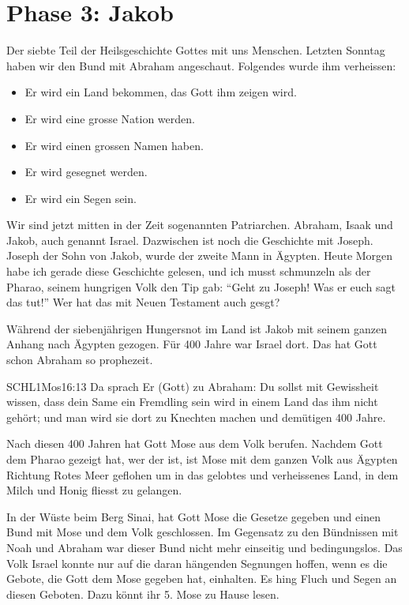 \section{Phase 3: Jakob}

    Der siebte Teil der Heilsgeschichte Gottes mit uns Menschen. Letzten Sonntag haben wir den Bund mit Abraham angeschaut. Folgendes wurde ihm verheissen:
    \begin{itemize}
        \item Er wird ein Land bekommen, das Gott ihm zeigen wird.
        \item Er wird eine grosse Nation werden.
        \item Er wird einen grossen Namen haben.
        \item Er wird gesegnet werden.
        \item Er wird ein Segen sein.
    \end{itemize}
    Wir sind jetzt mitten in der Zeit sogenannten Patriarchen. Abraham, Isaak und Jakob, auch genannt Israel. Dazwischen ist noch die Geschichte mit Joseph. Joseph der Sohn von Jakob, wurde der zweite Mann in Ägypten.  Heute Morgen habe ich gerade diese Geschichte gelesen, und ich musst schmunzeln als der Pharao, seinem hungrigen Volk den Tip gab: \enquote{Geht zu Joseph! Was er euch sagt das tut!} Wer hat das mit Neuen Testament auch gesgt?
    
    Während der siebenjährigen Hungersnot im Land ist Jakob mit seinem ganzen Anhang nach Ägypten gezogen. Für 400 Jahre war Israel dort. Das hat Gott schon Abraham so prophezeit.
    \begin{bibelquote}{SCHL}{1Mos}{16:13}
        Da sprach Er (Gott) zu Abraham: Du sollst mit Gewissheit wissen, dass dein Same ein Fremdling sein wird in einem Land das ihm nicht gehört; und man wird sie dort zu Knechten machen und demütigen 400 Jahre.
    \end{bibelquote}
    Nach diesen 400 Jahren hat Gott Mose aus dem Volk berufen. Nachdem Gott dem Pharao gezeigt hat, wer der \herr ist, ist Mose mit dem ganzen Volk aus Ägypten Richtung Rotes Meer geflohen um in das gelobtes und verheissenes Land, in dem Milch und Honig fliesst zu gelangen.

    In der Wüste beim Berg Sinai, hat Gott Mose die Gesetze gegeben und einen Bund mit Mose und dem Volk geschlossen. Im Gegensatz zu den Bündnissen mit Noah und Abraham war dieser Bund nicht mehr einseitig und bedingungslos. Das Volk Israel konnte nur auf die daran hängenden Segnungen hoffen, wenn es die Gebote, die Gott dem Mose gegeben hat, einhalten. Es hing Fluch und Segen an diesen Geboten. Dazu könnt ihr 5. Mose zu Hause lesen.


